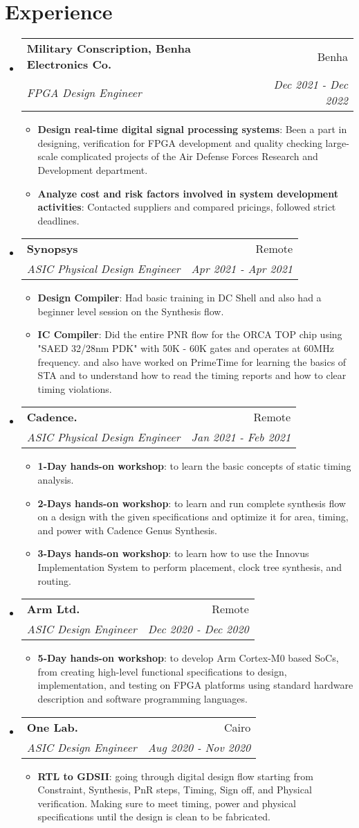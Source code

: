 \documentclass[a4paper,20pt]{article}
\makeatletter
\newcommand{\resumeItem}[2]{
  \item\small{
    \textbf{#1}{: #2 \vspace{-2pt}}
  }
}
\newcommand{\resumeSubheading}[4]{
  \vspace{-1pt}\item
    \begin{tabular*}{0.97\textwidth}{l@{\extracolsep{\fill}}r}
      \textbf{#1} & #2 \\
      \textit{#3} & \textit{#4} \\
    \end{tabular*}\vspace{-5pt}
}
\newcommand{\resumeSubHeadingListStart}{\begin{itemize}[leftmargin=*]}
\newcommand{\resumeSubHeadingListEnd}{\end{itemize}}
\newcommand{\resumeItemListStart}{\begin{itemize}}
\newcommand{\resumeItemListEnd}{\end{itemize}\vspace{-5pt}}
\makeatother
\begin{document}
\section{Experience}
  \resumeSubHeadingListStart
  \resumeSubheading{Military Conscription, Benha Electronics Co.}{Benha}
  {FPGA Design Engineer}{Dec 2021 - Dec 2022}
  \resumeItemListStart
  \resumeItem{Design real-time digital signal processing systems}
  {Been a part in designing, verification for FPGA development and quality checking large-scale complicated projects of the Air Defense Forces Research and Development department.}
  \resumeItem{Analyze cost and risk factors involved in system development activities}
  {Contacted suppliers and compared pricings, followed strict deadlines.}
  \resumeItemListEnd
    \resumeSubheading{Synopsys}{Remote}
    {ASIC Physical Design Engineer}{Apr 2021 - Apr 2021}
    \resumeItemListStart
        \resumeItem{Design Compiler}
          {Had basic training in DC Shell and also had a beginner level session on the Synthesis flow.}
          \resumeItem{IC Compiler}
          {Did the entire PNR flow for the ORCA TOP chip using "SAED 32/28nm PDK" with 50K - 60K gates and operates at 60MHz frequency. and also have worked on PrimeTime for learning the basics of STA and to understand how to read the timing reports and how to clear timing violations.}
      \resumeItemListEnd
\vspace{-5pt}
    \resumeSubheading
		{Cadence.}{Remote}
		{ASIC Physical Design Engineer}{Jan 2021 - Feb 2021}
		\resumeItemListStart
        \resumeItem{1-Day hands-on workshop}
          {to learn the basic concepts of static timing analysis.}
        \resumeItem{2-Days hands-on workshop}
          {to learn and run complete synthesis flow on a design with the given specifications and optimize it for area, timing, and power with Cadence Genus Synthesis.}
        \resumeItem{3-Days hands-on workshop}{to learn how to use the Innovus Implementation System to perform placement, clock tree synthesis, and routing.}
		\resumeItemListEnd
		\vspace{-5pt}
\resumeSubheading
{Arm Ltd.}{Remote}
{ASIC Design Engineer}{Dec 2020 - Dec 2020}
\resumeItemListStart
\resumeItem{5-Day hands-on workshop}
{to develop Arm Cortex-M0 based SoCs, from creating high-level functional specifications to design, implementation, and testing on FPGA platforms using standard hardware description and software programming languages.}
\resumeItemListEnd
	\resumeSubheading {One Lab.}{Cairo}
{ASIC Design Engineer}{Aug 2020 - Nov 2020}
\resumeItemListStart
\resumeItem{RTL to GDSII}
{going through digital design flow starting from Constraint, Synthesis, PnR steps, Timing, Sign off, and Physical verification. Making sure to meet timing, power and physical specifications until the design is clean to be fabricated.}
\resumeItemListEnd
\resumeSubHeadingListEnd
\end{document}
